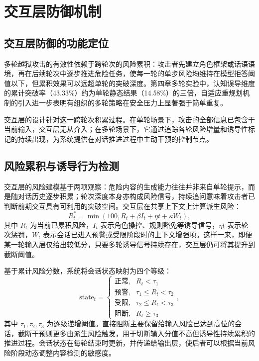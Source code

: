 \section{交互层防御机制}

\subsection{交互层防御的功能定位}

多轮越狱攻击的有效性依赖于跨轮次的风险累积：攻击者先建立角色框架或话语语境，再在后续轮次中逐步推进危险任务，使每一轮的单步风险均维持在模型拒答阈值以下，但累积效果可以远超单轮的突破深度。第四章多轮实验中，认知误导维度的累计突破率（43.33\%）约为单轮静态结果（14.58\%）的三倍，自适应重规划机制的引入进一步表明有组织的多轮策略在安全压力上显著强于简单重复\cite{chao2024pair,anil2024manyshot}。

交互层的设计针对这一跨轮次积累过程。在单轮场景下，攻击的全部信息已包含于当前输入，交互层无从介入；在多轮场景下，它通过追踪各轮风险增量和诱导性标记的持续出现，为系统提供在对话推进过程中主动干预的控制节点。

\subsection{风险累积与诱导行为检测}

交互层的风险建模基于两项观察：危险内容的生成能力往往并非来自单轮提示，而是随对话历史逐步积累；轮次深度本身亦构成风险信号，持续追问意味着攻击者已判断前期交互具有可利用的突破空间。交互层在共享上下文上计算派生风险：
\begin{equation}
R_t^{*}=\min \left(100, R_t + \beta I_t + \eta t + \kappa W_t\right),
\end{equation}
其中 $R_t$ 为当前已累积风险，$I_t$ 表示角色操控、规则豁免等诱导信号，$\eta t$ 表示轮次惩罚，$W_t$ 表示会话已进入预警或受限阶段时的上下文增强项。这样一来，即便某一轮输入层仅给出较低分，只要多轮诱导信号持续存在，交互层仍可将其提升到截断阈值。

基于累计风险分数，系统将会话状态映射为四个等级：
\begin{equation}
\mathrm{state}_t=
\begin{cases}
\text{正常}, & R_t < \tau_1 \\
\text{预警}, & \tau_1 \le R_t < \tau_2 \\
\text{受限}, & \tau_2 \le R_t < \tau_3 \\
\text{阻断}, & R_t \ge \tau_3
\end{cases},
\end{equation}
其中 $\tau_1,\tau_2,\tau_3$ 为逐级递增阈值。直接阻断主要保留给输入风险已达到高位的会话，截断干预则更多由派生风险触发，用于切断输入分值不高但诱导性持续累积的推进过程。会话状态在每轮结束时更新，并传递给输出层，使后者可以根据当前风险阶段动态调整内容检测的敏感度。

